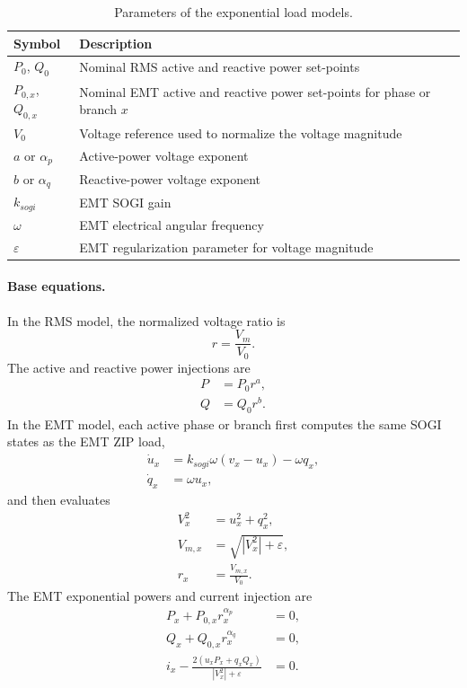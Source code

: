 \begin{table}[H]
    \centering
    \caption{Parameters of the exponential load models.}
    \begin{tabular}{ll}
        \toprule
        Symbol & Description \\
        \midrule
        $P_0$, $Q_0$ & Nominal RMS active and reactive power set-points \\
        $P_{0,x}$, $Q_{0,x}$ & Nominal EMT active and reactive power set-points for phase or branch $x$ \\
        $V_0$ & Voltage reference used to normalize the voltage magnitude \\
        $a$ or $\alpha_p$ & Active-power voltage exponent \\
        $b$ or $\alpha_q$ & Reactive-power voltage exponent \\
        $k_{sogi}$ & EMT SOGI gain \\
        $\omega$ & EMT electrical angular frequency \\
        $\varepsilon$ & EMT regularization parameter for voltage magnitude \\
        \bottomrule
    \end{tabular}
\end{table}

\paragraph{Base equations.}
In the RMS model, the normalized voltage ratio is
\begin{equation}
    r = \frac{V_m}{V_0}.
\end{equation}
The active and reactive power injections are
\begin{align}
    P &= P_0 r^a, \\
    Q &= Q_0 r^b.
\end{align}
In the EMT model, each active phase or branch first computes the same SOGI states as the EMT ZIP load,
\begin{align}
    \dot{u}_x &= k_{sogi}\omega\left(v_x-u_x\right)-\omega q_x, \\
    \dot{q}_x &= \omega u_x,
\end{align}
and then evaluates
\begin{align}
    V_x^2 &= u_x^2 + q_x^2, \\
    V_{m,x} &= \sqrt{\left|V_x^2\right|+\varepsilon}, \\
    r_x &= \frac{V_{m,x}}{V_0}.
\end{align}
The EMT exponential powers and current injection are
\begin{align}
    P_x + P_{0,x} r_x^{\alpha_p} &= 0, \\
    Q_x + Q_{0,x} r_x^{\alpha_q} &= 0, \\
    i_x - \frac{2\left(u_x P_x + q_x Q_x\right)}{\left|V_x^2\right|+\varepsilon} &= 0.
\end{align}

